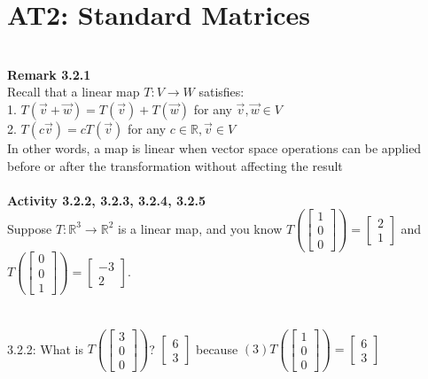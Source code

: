 \documentclass{article}
\begin{document}
\section{AT2: Standard Matrices}\\
\textbf{Remark 3.2.1}\\
Recall that a linear map $T:V\rightarrow W$ satisfies:\\
1. $T(\vec{v}+\vec{w}) = T(\vec{v})+T(\vec{w})$ for any $\vec{v},\vec{w} \in V$\\
2. $T(c\vec{v}) = cT(\vec{v})$ for any $c \in \mathbb{R}, \vec{v} \in V$\\
In other words, a map is linear when vector space operations can be applied before or after the transformation without affecting the result\\
\\
\textbf{Activity 3.2.2, 3.2.3, 3.2.4, 3.2.5}\\
Suppose $T: \mathbb{R}^3 \rightarrow \mathbb{R}^2$ is a linear map, and you know 
$T\left(\left[\begin{array}{c} 1 \\ 0 \\ 0 \end{array}\right] \right) =
\left[\begin{array}{c} 2 \\ 1 \end{array}\right]$ and
$T\left(\left[\begin{array}{c} 0 \\ 0 \\ 1 \end{array}\right] \right) =
\left[\begin{array}{c} -3 \\ 2 \end{array}\right]$. \\
\\
\\
3.2.2: What is $T\left(\left[\begin{array}{c} 3 \\ 0 \\ 0 \end{array}\right]\right)$? $\displaystyle \left[\begin{array}{c} 6 \\ 3\end{array}\right]$ because $ (3)T\left(\left[\begin{array}{c} 1 \\ 0 \\ 0 \end{array}\right] \right) = \left[\begin{array}{c} 6 \\ 3\end{array}\right]$\\
\end{document}
